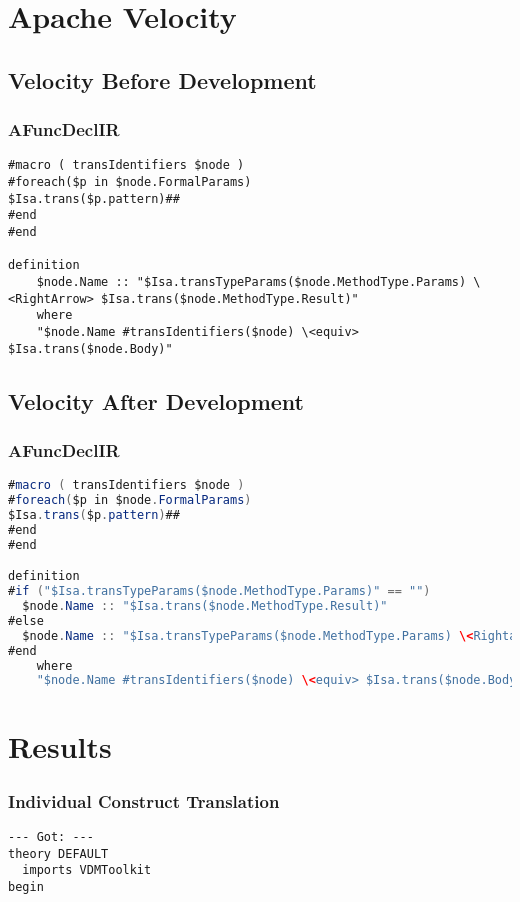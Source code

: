 \begin{appendices}
\chapter{Apache Velocity} \label{velocity}
\section{Velocity Before Development} \label{Velocitybefore}
\subsection{AFuncDeclIR}
\begin{lstlisting}[language=Velocity]
#macro ( transIdentifiers $node )
#foreach($p in $node.FormalParams)
$Isa.trans($p.pattern)##
#end
#end

definition
    $node.Name :: "$Isa.transTypeParams($node.MethodType.Params) \<RightArrow> $Isa.trans($node.MethodType.Result)"
    where
    "$node.Name #transIdentifiers($node) \<equiv> $Isa.trans($node.Body)"

\end{lstlisting}
\section{Velocity After Development} \label{Velocityafter}
\subsection{AFuncDeclIR}
\begin{lstlisting}[language=Java]
#macro ( transIdentifiers $node )
#foreach($p in $node.FormalParams)
$Isa.trans($p.pattern)##
#end
#end

definition
#if ("$Isa.transTypeParams($node.MethodType.Params)" == "")
  $node.Name :: "$Isa.trans($node.MethodType.Result)"
#else
  $node.Name :: "$Isa.transTypeParams($node.MethodType.Params) \<Rightarrow> $Isa.trans($node.MethodType.Result)"
#end
    where
    "$node.Name #transIdentifiers($node) \<equiv> $Isa.trans($node.Body)"
\end{lstlisting}

\chapter{Results} \label{results}
\subsection{Individual Construct Translation} \label{ict}
\begin{lstlisting}[language=Isabelle]
 --- Got: ---
theory DEFAULT
  imports VDMToolkit
begin


\end{lstlisting}
\end{appendices}
